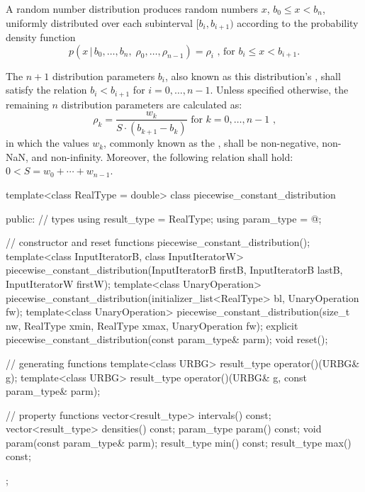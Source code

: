 \pnum
A  random number distribution
produces random numbers $x$,
$b_0 \leq x < b_n$,
uniformly distributed over each subinterval
$[ b_i, b_{i+1} )$
according to the probability density function
%
%
\[ p(x \,|\, b_0, \dotsc, b_n, \; \rho_0, \dotsc, \rho_{n-1}) = \rho_i
   \text{ , for $b_i \le x < b_{i+1}$.} \]

\pnum
The $n + 1$ distribution parameters $b_i$,
also known as this distribution's %
%
%
, shall satisfy the relation
$b_i < b_{i + 1}$ for $i = 0, \dotsc, n - 1$.
Unless specified otherwise,
the remaining $n$ distribution parameters are calculated as:
\[ \rho_k = \frac{w_k}{S \cdot (b_{k+1}-b_k)} \text{ for } k = 0, \dotsc, n - 1 \text{ ,} \]
in which the values $w_k$,
commonly known as the %
%
%
, shall be non-negative, non-NaN, and non-infinity.
Moreover, the following relation shall hold:
 $0 < S = w_0 + \dotsb + w_{n-1}$.

%
%
\begin{codeblock}
template<class RealType = double>
  class piecewise_constant_distribution {
  public:
    // types
    using result_type = RealType;
    using param_type  = @\unspec@;

    // constructor and reset functions
    piecewise_constant_distribution();
    template<class InputIteratorB, class InputIteratorW>
      piecewise_constant_distribution(InputIteratorB firstB, InputIteratorB lastB,
                                      InputIteratorW firstW);
    template<class UnaryOperation>
      piecewise_constant_distribution(initializer_list<RealType> bl, UnaryOperation fw);
    template<class UnaryOperation>
      piecewise_constant_distribution(size_t nw, RealType xmin, RealType xmax,
                                      UnaryOperation fw);
    explicit piecewise_constant_distribution(const param_type& parm);
    void reset();

    // generating functions
    template<class URBG>
      result_type operator()(URBG& g);
    template<class URBG>
      result_type operator()(URBG& g, const param_type& parm);

    // property functions
    vector<result_type> intervals() const;
    vector<result_type> densities() const;
    param_type param() const;
    void param(const param_type& parm);
    result_type min() const;
    result_type max() const;
  };
\end{codeblock}


